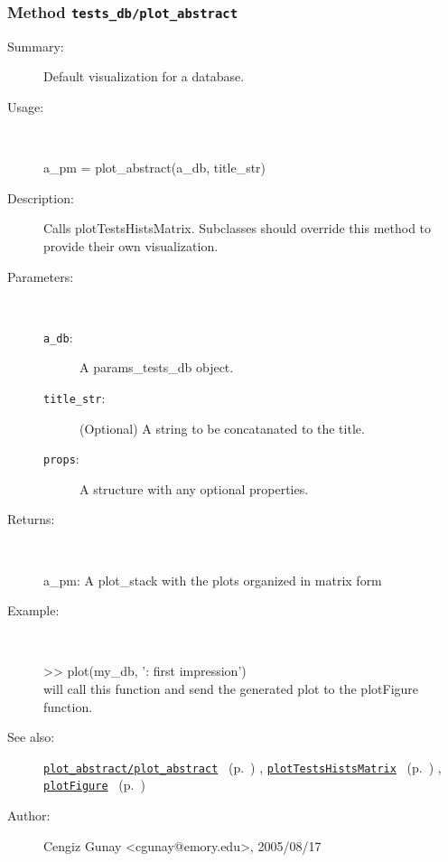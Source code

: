 \subsubsection[Method \texttt{plot\_abstract}]{Method \texttt{tests\_db/plot\_abstract}}%
%
\label{ref_tests_db__plot_abstract}%
\hypertarget{ref_tests_db__plot_abstract}{}%
\begin{description}
\item[Summary:]Default visualization for a database.
%
\item[Usage:]~%
\begin{lyxcode}%
a\_pm = plot\_abstract(a\_db, title\_str)
%
\end{lyxcode}%
%
\item[Description:]%
Calls plotTestsHistsMatrix. Subclasses should override this method
 to provide their own visualization.
\item[Parameters:]~
\begin{description}%
\item[\texttt{a\_db}:]
 A params\_tests\_db object.
\item[\texttt{title\_str}:]
 (Optional) A string to be concatanated to the title.
\item[\texttt{props}:]
 A structure with any optional properties.
\end{description}%
%
\item[Returns:
]~

	a\_pm: A plot\_stack with the plots organized in matrix form
%
\item[Example:]~
\begin{lyxcode}   >> plot(my\_db, ': first impression')
\\%
 will call this function and send the generated plot to the plotFigure function.
\\%
\end{lyxcode}
%
\item[See also:]%
\hyperlink{ref_plot_abstract__plot_abstract}{\texttt{plot\_abstract/plot\_abstract}}%
\ (p.~\pageref{ref_plot_abstract__plot_abstract})%
%
, \hyperlink{ref_plotTestsHistsMatrix}{\texttt{plotTestsHistsMatrix}}%
\ (p.~\pageref{ref_plotTestsHistsMatrix})%
%
, \hyperlink{ref_plotFigure}{\texttt{plotFigure}}%
\ (p.~\pageref{ref_plotFigure})%
%
%
\item[Author:]%
Cengiz Gunay <cgunay@emory.edu>, 2005/08/17
%
\end{description}
\methodline%

